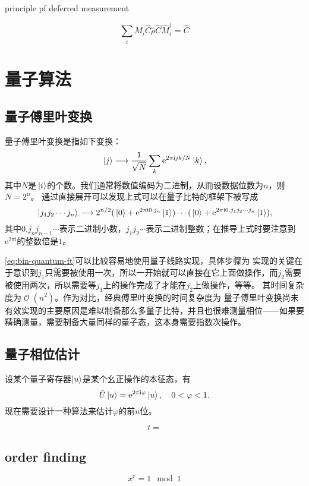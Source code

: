 \documentclass[hyperref, UTF8, a4paper]{ctexart}
\newcommand*{\ii}{\mathrm{i}}
\newcommand*{\ee}{\mathrm{e}}
\DeclareMathOperator{\bigO}{\mathcal{O}}
\begin{document}
principle pf deferred measurement

\[
    \sum_{i} \hat{M}_i \hat{C} \hat{\rho} \hat{C} \hat{M}_i^\dagger = \hat{C} 
\]

\section{量子算法}

\subsection{量子傅里叶变换}

量子傅里叶变换是指如下变换：
\begin{equation}
    \ket*{j} \longrightarrow \frac{1}{\sqrt{N}} \sum_k \ee^{2 \pi \ii j k / N} \ket*{k},
\end{equation}
其中$N$是$\ket*{i}$的个数。我们通常将数值编码为二进制，从而设数据位数为$n$，则$N=2^n$。
通过直接展开可以发现上式可以在量子比特的框架下被写成
\begin{equation}
    \ket*{j_1 j_2 \cdots j_n} \longrightarrow 2^{n/2} (\ket*{0} + \ee^{2\pi \ii 0.j_n} \ket*{1}) \cdots (\ket*{0} + \ee^{2 \pi \ii 0.j_1 j_2 \cdots j_n} \ket*{1}),
    \label{eq:bin-quantum-ft}
\end{equation}
其中$0.j_n j_{n-1} \cdots$表示二进制小数，$j_1 j_2 \cdots$表示二进制整数；在推导上式时要注意到$\ee^{2\pi \ii}$的整数倍是$1$。

\eqref{eq:bin-quantum-ft}可以比较容易地使用量子线路实现，具体步骤为
实现的关键在于意识到$j_1$只需要被使用一次，所以一开始就可以直接在它上面做操作，而$j_2$需要被使用两次，所以需要等$j_1$上的操作完成了才能在$j_2$上做操作，等等。
其时间复杂度为$\bigO(n^2)$。作为对比，经典傅里叶变换的时间复杂度为
量子傅里叶变换尚未有效实现的主要原因是难以制备那么多量子比特，并且也很难测量相位——如果要精确测量，需要制备大量同样的量子态，这本身需要指数次操作。

\subsection{量子相位估计}

设某个量子寄存器$\ket{u}$是某个幺正操作的本征态，有
\begin{equation}
    \hat{U} \ket{u} = \ee^{2\pi \ii \varphi} \ket{u}, \quad 0 < \varphi < 1.
\end{equation}
现在需要设计一种算法来估计$\varphi$的前$n$位。

\begin{equation}
    t = 
\end{equation}

\subsection{order finding}

\begin{equation}
    x^r = 1 \mod{1}
\end{equation}
\end{document}
